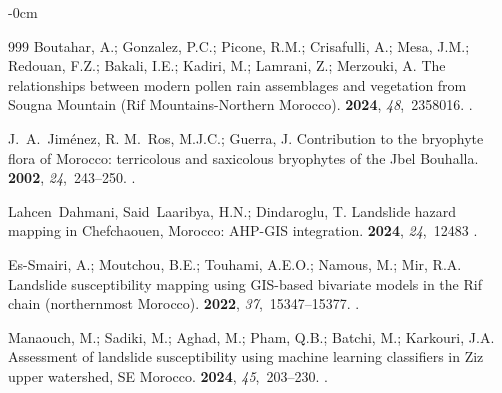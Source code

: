 \documentclass[geomatics,article,accept,pdftex,oneauthor]{Definitions/mdpi}
\begin{document}
\begin{adjustwidth}{-\extralength}{0cm}
\begin{thebibliography}{999}
Boutahar, A.; Gonzalez, P.C.; Picone, R.M.; Crisafulli, A.; Mesa, J.M.;
  Redouan, F.Z.; Bakali, I.E.; Kadiri, M.; Lamrani, Z.; Merzouki, A.
\newblock The relationships between modern pollen rain assemblages and
  vegetation from Sougna Mountain (Rif Mountains-Northern Morocco).
 {\bf 2024}, {\em 48},~2358016.
.

J.~A.~Jiménez, R. M.~Ros, M.J.C.; Guerra, J.
\newblock Contribution to the bryophyte flora of Morocco: terricolous and
  saxicolous bryophytes of the Jbel Bouhalla.
 {\bf 2002}, {\em 24},~243--250.
.

Lahcen~Dahmani, Said~Laaribya, H.N.; Dindaroglu, T.
\newblock Landslide hazard mapping in Chefchaouen, Morocco: AHP-GIS
  integration.
 {\bf 2024}, {\em
  24},~12483
.

Es-Smairi, A.; Moutchou, B.E.; Touhami, A.E.O.; Namous, M.; Mir, R.A.
\newblock Landslide susceptibility mapping using GIS-based bivariate models in
  the Rif chain (northernmost Morocco).
 {\bf 2022}, {\em 37},~15347--15377.
.

Manaouch, M.; Sadiki, M.; Aghad, M.; Pham, Q.B.; Batchi, M.; Karkouri, J.A.
\newblock Assessment of landslide susceptibility using machine learning
  classifiers in Ziz upper watershed, SE Morocco.
 {\bf 2024}, {\em 45},~203--230.
.

\end{thebibliography}


\PublishersNote{}
\end{adjustwidth}
\end{document}
